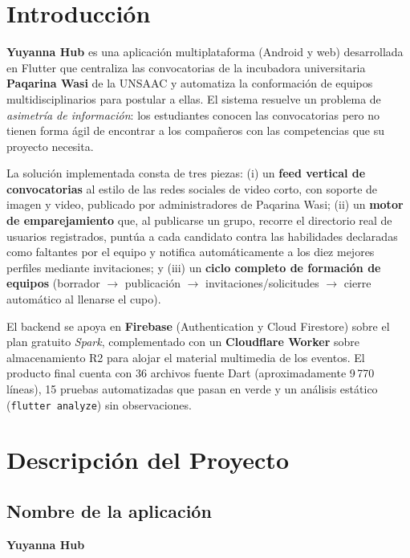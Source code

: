\documentclass[12pt,a4paper]{article}
\begin{document}

\maketitle
\tableofcontents
\newpage

\section*{Introducción}

\textbf{Yuyanna Hub} es una aplicación multiplataforma (Android y web) desarrollada en Flutter que centraliza las convocatorias de la incubadora universitaria \textbf{Paqarina Wasi} de la UNSAAC y automatiza la conformación de equipos multidisciplinarios para postular a ellas. El sistema resuelve un problema de \emph{asimetría de información}: los estudiantes conocen las convocatorias pero no tienen forma ágil de encontrar a los compañeros con las competencias que su proyecto necesita.

La solución implementada consta de tres piezas: (i) un \textbf{feed vertical de convocatorias} al estilo de las redes sociales de video corto, con soporte de imagen y video, publicado por administradores de Paqarina Wasi; (ii) un \textbf{motor de emparejamiento} que, al publicarse un grupo, recorre el directorio real de usuarios registrados, puntúa a cada candidato contra las habilidades declaradas como faltantes por el equipo y notifica automáticamente a los diez mejores perfiles mediante invitaciones; y (iii) un \textbf{ciclo completo de formación de equipos} (borrador $\rightarrow$ publicación $\rightarrow$ invitaciones/solicitudes $\rightarrow$ cierre automático al llenarse el cupo).

El backend se apoya en \textbf{Firebase} (Authentication y Cloud Firestore) sobre el plan gratuito \emph{Spark}, complementado con un \textbf{Cloudflare Worker} sobre almacenamiento R2 para alojar el material multimedia de los eventos. El producto final cuenta con 36 archivos fuente Dart (aproximadamente 9\,770 líneas), 15 pruebas automatizadas que pasan en verde y un análisis estático (\texttt{flutter analyze}) sin observaciones.

\newpage
\section{Descripción del Proyecto}

\subsection{Nombre de la aplicación}
\textbf{Yuyanna Hub}
\end{document}
